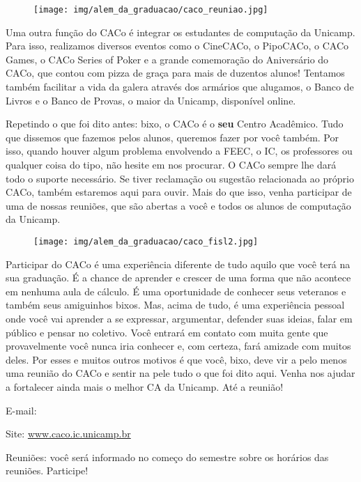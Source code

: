 \begin{figure}[H]
    \centering
    \texttt{[image: img/alem\_da\_graduacao/caco\_reuniao.jpg]}
\end{figure}

Uma outra função do CACo é integrar os estudantes de computação da Unicamp. Para
isso, realizamos diversos eventos como o CineCACo, o PipoCACo, o CACo Games, o
CACo Series of Poker e a grande comemoração do Aniversário do CACo, que contou
com pizza de graça para mais de duzentos alunos! Tentamos também facilitar a
vida da galera através dos armários que alugamos, o Banco de Livros e o Banco de
Provas, o maior da Unicamp, disponível online.

Repetindo o que foi dito antes: bixo, o CACo é o \textbf{seu} Centro Acadêmico.
Tudo que dissemos que fazemos pelos alunos, queremos fazer por você também. Por
isso, quando houver algum problema envolvendo a FEEC, o IC, os professores ou
qualquer coisa do tipo, não hesite em nos procurar. O CACo sempre lhe dará todo
o suporte necessário. Se tiver reclamação ou sugestão relacionada ao próprio
CACo, também estaremos aqui para ouvir. Mais do que isso, venha participar de
uma de nossas reuniões, que são abertas a você e todos os alunos de computação
da Unicamp.

\begin{figure}[H]
    \centering
    \texttt{[image: img/alem\_da\_graduacao/caco\_fisl2.jpg]}
\end{figure}

Participar do CACo é uma experiência diferente de tudo aquilo que você terá na
sua graduação. É a chance de aprender e crescer de uma forma que não acontece em
nenhuma aula de cálculo. É uma oportunidade de conhecer seus veteranos e também
seus amiguinhos bixos. Mas, acima de tudo, é uma experiência pessoal onde você
vai aprender a se expressar, argumentar, defender suas ideias, falar em público
e pensar no coletivo. Você entrará em contato com muita gente que provavelmente
você nunca iria conhecer e, com certeza, fará amizade com muitos deles. Por
esses e muitos outros motivos é que você, bixo, deve vir a pelo menos uma
reunião do CACo e sentir na pele tudo o que foi dito aqui. Venha nos ajudar a
fortalecer ainda mais o melhor CA da Unicamp. Até a reunião!

\begin{compactitemize}
    \item  E-mail: 
    \item  Site: \url{www.caco.ic.unicamp.br}
    \item  Reuniões: você será informado no começo do semestre sobre os horários
        das reuniões. Participe!
\end{compactitemize}

